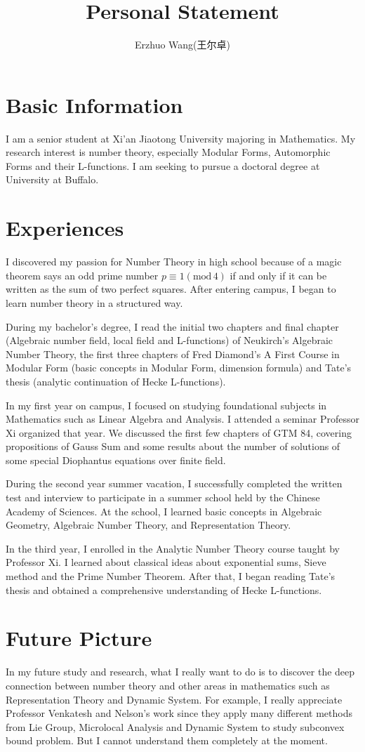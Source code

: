 \documentclass[12pt]{article}
\title{Personal Statement}
\author{Erzhuo Wang(王尔卓)}
\date{}
\renewcommand{\mod}[1]{(\text{mod}\,#1)}
\theoremstyle{definition}
\begin{document}
\maketitle 
\section{Basic Information}
I am a senior student at Xi'an Jiaotong University majoring in Mathematics. 
My research interest is number theory, especially Modular Forms, Automorphic Forms and their L-functions. 
I am seeking to pursue a doctoral degree at University at Buffalo.
\section{Experiences}
I discovered my passion for Number Theory in high school because of a magic theorem says an odd prime number 
$p \equiv 1\mod{4}$ if and only if it can be written as the sum of two perfect squares. 
After entering campus, I began to learn number theory in a structured way.

During my bachelor's degree,
I read the initial two chapters and final chapter (Algebraic number field, local field and L-functions) of Neukirch's Algebraic Number Theory, 
the first three chapters of Fred Diamond's A First Course in Modular Form (basic concepts in Modular Form, dimension formula)
and Tate's thesis (analytic continuation of Hecke L-functions).  

In my first year on campus, I focused on studying foundational subjects in Mathematics such as Linear Algebra and Analysis.
I attended a seminar Professor Xi organized that year. 
We discussed the first few chapters of GTM 84, covering propositions of Gauss Sum and some results about the number of 
solutions of some special
Diophantus equations over finite field. 

During the second year summer vacation, 
I successfully completed the written test and interview to participate in a summer school held by the Chinese Academy of Sciences. 
At the school, I learned basic concepts in Algebraic Geometry, Algebraic Number Theory, and Representation Theory. 

In the third year, I enrolled in the Analytic Number Theory course taught by Professor Xi. 
I learned about classical ideas about exponential sums, Sieve method and the Prime Number Theorem. 
After that, I began reading Tate's thesis and obtained a comprehensive understanding of Hecke L-functions. 
\section{Future Picture}
In my future study and research, what I really want to do is to 
discover the deep connection between number theory and other areas in mathematics such as Representation Theory 
and Dynamic System. 
For example, I really appreciate Professor Venkatesh and Nelson's work since they apply many different 
methods from Lie Group, Microlocal Analysis and Dynamic System to study subconvex bound problem. 
But I cannot understand them completely at the moment. 
\end{document}
